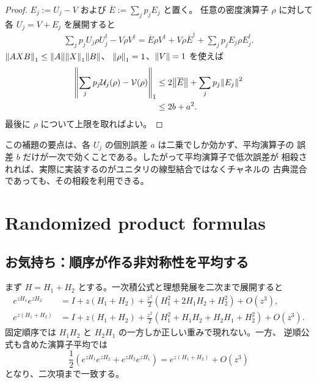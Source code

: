 \documentclass[uplatex,dvipdfmx,11pt,a4paper]{jsarticle}
\newcommand{\cU}{\mathcal{U}}
\newcommand{\cV}{\mathcal{V}}
\begin{document}
\begin{proof}
  $E_j:=U_j-V$ および $\overline{E}:=\sum_jp_jE_j$ と置く。
  任意の密度演算子 $\rho$ に対して各 $U_j=V+E_j$ を展開すると
  \begin{align}
    \sum_jp_jU_j\rho U_j^\dagger-V\rho V^\dagger
    =\overline{E}\rho V^\dagger
     +V\rho\overline{E}^\dagger
     +\sum_jp_jE_j\rho E_j^\dagger.
    \label{eq:mixing-expansion}
  \end{align}
  $\norm{AXB}_1\leq\norm{A}\norm{X}_1\norm{B}$、
  $\norm{\rho}_1=1$、$\norm{V}=1$ を使えば
  \begin{align}
    \norm{\sum_jp_j\cU_j(\rho)-\cV(\rho)}_1
    &\leq2\norm{\overline{E}}
      +\sum_jp_j\norm{E_j}^2\\
    &\leq2b+a^2.
  \end{align}
  最後に $\rho$ について上限を取ればよい。
\end{proof}

この補題の要点は、各 $U_j$ の個別誤差 $a$ は二乗でしか効かず、平均演算子の
誤差 $b$ だけが一次で効くことである。したがって平均演算子で低次誤差が
相殺されれば、実際に実装するのがユニタリの線型結合ではなくチャネルの
古典混合であっても、その相殺を利用できる。

\section{Randomized product formulas}

\subsection{お気持ち：順序が作る非対称性を平均する}

まず $H=H_1+H_2$ とする。一次積公式と理想発展を二次まで展開すると
\begin{align}
  e^{zH_1}e^{zH_2}
  &={I}+z(H_1+H_2)
    +\frac{z^2}{2}(H_1^2+2H_1H_2+H_2^2)
    +O(z^3),
    \label{eq:forward-expansion}\\
  e^{z(H_1+H_2)}
  &={I}+z(H_1+H_2)
    +\frac{z^2}{2}(H_1^2+H_1H_2+H_2H_1+H_2^2)
    +O(z^3).
    \label{eq:ideal-expansion}
\end{align}
固定順序では $H_1H_2$ と $H_2H_1$ の一方しか正しい重みで現れない。一方、
逆順公式も含めた演算子平均では
\begin{equation}
  \frac12\left(e^{zH_1}e^{zH_2}+e^{zH_2}e^{zH_1}\right)
  =e^{z(H_1+H_2)}+O(z^3)
  \label{eq:two-term-average}
\end{equation}
となり、二次項まで一致する。
\end{document}
